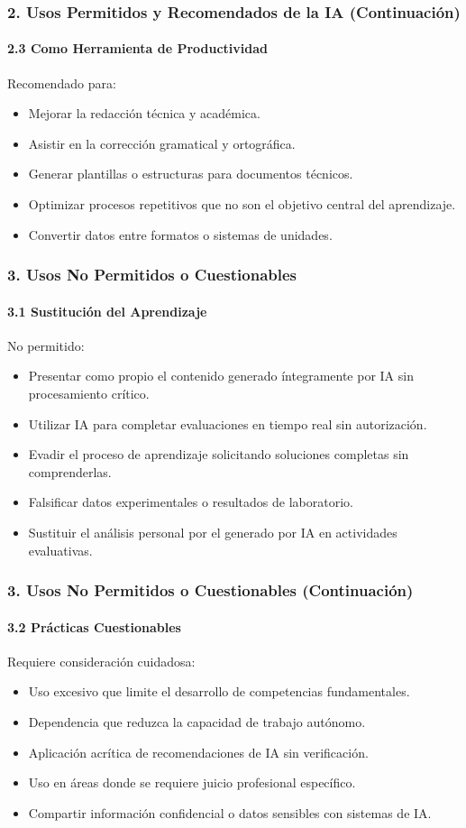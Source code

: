 \documentclass{beamer}
\begin{document}
	\begin{frame}
		\frametitle{2. Usos Permitidos y Recomendados de la IA (Continuación)}
		\framesubtitle{2.3 Como Herramienta de Productividad}
		Recomendado para:
		\begin{itemize}
			\item Mejorar la redacción técnica y académica.
			\item Asistir en la corrección gramatical y ortográfica.
			\item Generar plantillas o estructuras para documentos técnicos.
			\item Optimizar procesos repetitivos que no son el objetivo central del aprendizaje.
			\item Convertir datos entre formatos o sistemas de unidades.
		\end{itemize}
	\end{frame}
	
	\begin{frame}
		\frametitle{3. Usos No Permitidos o Cuestionables}
		\framesubtitle{3.1 Sustitución del Aprendizaje}
		No permitido:
		\begin{itemize}
			\item Presentar como propio el contenido generado íntegramente por IA sin procesamiento crítico.
			\item Utilizar IA para completar evaluaciones en tiempo real sin autorización.
			\item Evadir el proceso de aprendizaje solicitando soluciones completas sin comprenderlas.
			\item Falsificar datos experimentales o resultados de laboratorio.
			\item Sustituir el análisis personal por el generado por IA en actividades evaluativas.
		\end{itemize}
	\end{frame}
	
	\begin{frame}
		\frametitle{3. Usos No Permitidos o Cuestionables (Continuación)}
		\framesubtitle{3.2 Prácticas Cuestionables}
		Requiere consideración cuidadosa:
		\begin{itemize}
			\item Uso excesivo que limite el desarrollo de competencias fundamentales.
			\item Dependencia que reduzca la capacidad de trabajo autónomo.
			\item Aplicación acrítica de recomendaciones de IA sin verificación.
			\item Uso en áreas donde se requiere juicio profesional específico.
			\item Compartir información confidencial o datos sensibles con sistemas de IA.
		\end{itemize}
	\end{frame}
	
\end{document}
